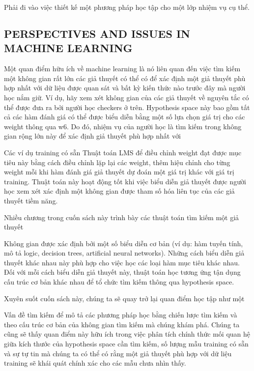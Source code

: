 Phải đi vào việc thiết kế một phương pháp học tập cho một lớp nhiệm vụ cụ thể.

\subsection{PERSPECTIVES AND ISSUES IN MACHINE LEARNING}

Một quan điểm hữu ích về machine learning là nó liên quan đến việc tìm kiếm một không gian rất lớn các giả thuyết có thể có để xác định một giả thuyết phù hợp nhất với dữ liệu được quan sát và bất kỳ kiến ​​thức nào trước đây mà người học nắm giữ. Ví dụ, hãy xem xét không gian của các giả thuyết về nguyên tắc có thể được đưa ra bởi người học checkers ở trên. Hypothesis space này bao gồm tất cả các hàm đánh giá có thể được biểu diễn bằng một số lựa chọn giá trị cho các weight thông qua w6. Do đó, nhiệm vụ của người học là tìm kiếm trong không gian rộng lớn này để xác định giả thuyết phù hợp nhất với

Các ví dụ training có sẵn Thuật toán LMS để điều chỉnh weight đạt được mục tiêu này bằng cách điều chỉnh lặp lại các weight, thêm hiệu chỉnh cho từng weight mỗi khi hàm đánh giá giả thuyết dự đoán một giá trị khác với giá trị training. Thuật toán này hoạt động tốt khi việc biểu diễn giả thuyết được người học xem xét xác định một không gian được tham số hóa liên tục của các giả thuyết tiềm năng.

Nhiều chương trong cuốn sách này trình bày các thuật toán tìm kiếm một giả thuyết

Không gian được xác định bởi một số biểu diễn cơ bản (ví dụ: hàm tuyến tính, mô tả logic, decision trees, artificial neural networks). Những cách biểu diễn giả thuyết khác nhau này phù hợp cho việc học các loại hàm mục tiêu khác nhau. Đối với mỗi cách biểu diễn giả thuyết này, thuật toán học tương ứng tận dụng cấu trúc cơ bản khác nhau để tổ chức tìm kiếm thông qua hypothesis space.

Xuyên suốt cuốn sách này, chúng ta sẽ quay trở lại quan điểm học tập như một

Vấn đề tìm kiếm để mô tả các phương pháp học bằng chiến lược tìm kiếm và theo cấu trúc cơ bản của không gian tìm kiếm mà chúng khám phá. Chúng ta cũng sẽ thấy quan điểm này hữu ích trong việc phân tích chính thức mối quan hệ giữa kích thước của hypothesis space cần tìm kiếm, số lượng mẫu training có sẵn và sự tự tin mà chúng ta có thể có rằng một giả thuyết phù hợp với dữ liệu training sẽ khái quát chính xác cho các mẫu chưa nhìn thấy.

